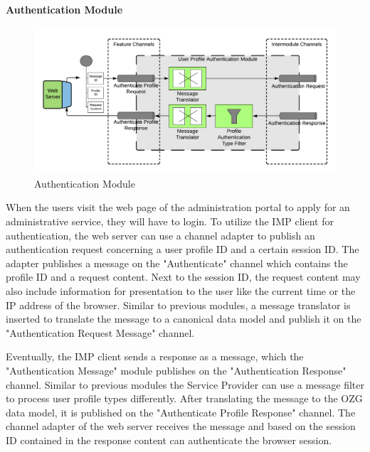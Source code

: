 \paragraph{Authentication Module}

\begin{figure}[H]
    \centering
    \includegraphics[scale=0.6]{Diagrams/Integration Architecture 1/Technological Integration/17. Authentication.pdf}
    \caption{Authentication Module}
    \label{integration1:authentication_module}
\end{figure}

When the users visit the web page of the administration portal to apply for an administrative service, they will have to login. To utilize the IMP client for authentication, the web server can use a channel adapter to publish an authentication request concerning a user profile ID and a certain session ID. The adapter publishes a message on the "Authenticate" channel which contains the profile ID and a request content. Next to the session ID, the request content may also include information for presentation to the user like the current time or the IP address of the browser. Similar to previous modules, a message translator is inserted to translate the message to a canonical data model and publish it on the "Authentication Request Message" channel.

Eventually, the IMP client sends a response as a message, which the "Authentication Message" module publishes on the "Authentication Response" channel. Similar to previous modules the Service Provider can use a message filter to process user profile types differently. After translating the message to the OZG data model, it is published on the "Authenticate Profile Response" channel. The channel adapter of the web server receives the message and based on the session ID contained in the response content can authenticate the browser session.

